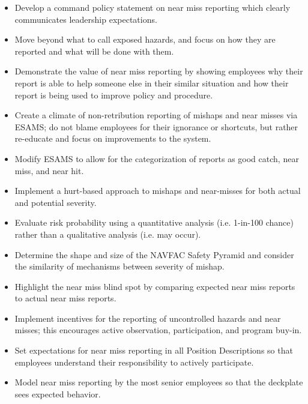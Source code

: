 \documentclass{tufte-handout}
\begin{document}
	\begin{itemize}
		\item Develop a command policy statement on near miss reporting which clearly communicates leadership expectations.
		\item Move beyond what to call exposed hazards, and focus on how they are reported and what will be done with them.
		\item Demonstrate the value of near miss reporting by showing employees why their report is able to help someone else in their similar situation and how their report is being used to improve policy and procedure.
		\item Create a climate of non-retribution reporting of mishaps and near misses via ESAMS; do not blame employees for their ignorance or shortcuts, but rather re-educate and focus on improvements to the system.
		\item Modify ESAMS to allow for the categorization of reports as good catch, near miss, and near hit.
		\item Implement a hurt-based approach to mishaps and near-misses for both actual and potential severity.
		\item Evaluate risk probability using a quantitative analysis (i.e. 1-in-100 chance) rather than a qualitative analysis (i.e. may occur).
		\item Determine the shape and size of the NAVFAC Safety Pyramid and consider the similarity of mechanisms between severity of mishap.
		\item Highlight the near miss blind spot by comparing expected near miss reports to actual near miss reports.
		\item Implement incentives for the reporting of uncontrolled hazards and near misses; this encourages active observation, participation, and program buy-in.
		\item Set expectations for near miss reporting in all Position Descriptions so that  employees understand their responsibility to actively participate.
		\item Model near miss reporting by the most senior employees so that the deckplate sees expected behavior.

\end{itemize}
\end{document}
